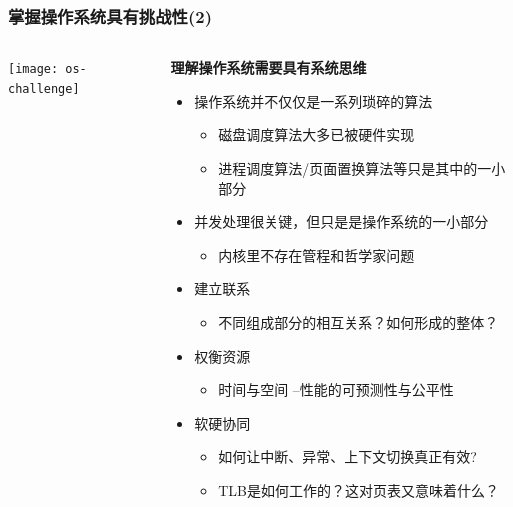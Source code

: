     
\begin{frame}
    \frametitle{掌握操作系统具有挑战性(2)}
    
        \begin{columns}
    	
    	\begin{column}{0.3\textwidth}	
    		\texttt{[image: os-challenge]}	
    	\end{column}
    
    	\begin{column}{0.7\textwidth}
    		
     \textbf{理解操作系统需要具有系统思维} 
    \begin{itemize}
        \item 操作系统并不仅仅是一系列琐碎的算法
            \begin{itemize}
                \item 磁盘调度算法大多已被硬件实现
                \item 进程调度算法/页面置换算法等只是其中的一小部分
            \end{itemize} \pause
        \item 并发处理很关键，但只是是操作系统的一小部分
            \begin{itemize}
                \item 内核里不存在管程和哲学家问题
            \end{itemize} \pause
    \end{itemize}

    \begin{itemize}
	\item 建立联系
    \begin{itemize}
        \item 不同组成部分的相互关系？如何形成的整体？
    \end{itemize} \pause                
	\item 权衡资源
	\begin{itemize}
		\item 时间与空间 --性能的可预测性与公平性
	\end{itemize} \pause
	\item 软硬协同
	\begin{itemize}
		\item 如何让中断、异常、上下文切换真正有效? 
		\item TLB是如何工作的？这对页表又意味着什么？
	\end{itemize}
\end{itemize}

    \end{column}

\end{columns}

\end{frame}


